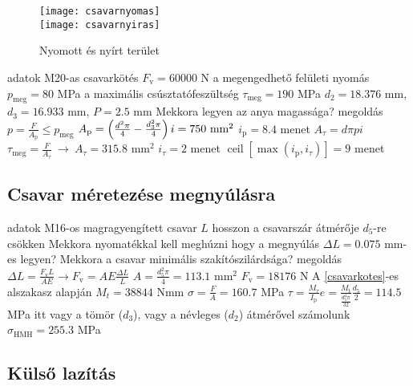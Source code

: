 \begin{wrapfigure}{r}{.4\textwidth}
 \vspace{-4cm}
 \centering
 \texttt{[image: csavarnyomas]}\\
 \texttt{[image: csavarnyiras]}
 \caption{Nyomott és nyírt terület}
\end{wrapfigure}
\parbox{.6\textwidth}{
\begin{outline}
	\1 adatok
		\2 M20-as csavarkötés
		\2 $F_\text{v} = 60000$ N
		\2 a megengedhető felületi nyomás $p_\text{meg} = 80$ MPa
		\2 a maximális csúsztatófeszültség $\tau_\text{meg} = 190$ MPa
		\2 $d_2 = 18.376$ mm, $d_3 = 16.933$ mm, $P = 2.5$ mm
		\2 Mekkora legyen az anya magassága?
	\1 megoldás
		\2 $p = \frac{F}{A_\text{p}} \le p_\text{meg}$
		\2 $A_\text{p} = \left(\frac{d^2\pi}{4} - \frac{d_3^2\pi}{4}\right)i = 750 \text{ mm}^2$
		\2 $i_\text{p} = 8.4$ menet
		\2 $A_\tau = d\pi pi$
		\2 $\tau_\text{meg} = \frac{F}{A_\tau}~\rightarrow~A_\tau=315.8\text{ mm}^2$
		\2 $i_\tau = 2$ menet
		\2 $\operatorname{ceil}[\max(i_\text{p}, i_\tau)] = 9$ menet
\end{outline}}

\subsection{Csavar méretezése megnyúlásra}%

\begin{outline}
	\1 adatok
		\2 M16-os magragyengített csavar
		\2 $L$ hosszon a csavarszár átmérője $d_5$-re csökken
		\2 Mekkora nyomatékkal kell meghúzni hogy a megnyúlás $\Delta L=0.075$ mm-es legyen?
		\2 Mekkora a csavar minimális szakítószilárdsága?
	\1 megoldás
		\2 $\Delta L = \frac{F_\text{v}L}{AE}\rightarrow F_\text{v} = AE\frac{\Delta L}{L}$
		\2 $A = \frac{d_5^2\pi}{4} = 113.1 \text{ mm}^2$
		\2 $F_\text{v} = 18176$ N
		\2 A \ref{csavarkotes}-es alszakasz alapján $M_t = 38844$ Nmm
		\2 $\sigma = \frac{F}{A} = 160.7$ MPa
		\2 $\tau = \frac{M_\tau}{I_\text{p}}e = \frac{M_\text{t}}{\frac{d_5^4\pi}{32}}\frac{d_5}{2} = 114.5$ MPa
		\2 itt vagy a tömör ($d_3$), vagy a névleges ($d_2$) átmérővel számolunk
		\2 $\sigma_\text{HMH} = 255.3$ MPa
\end{outline}

\subsection{Külső lazítás}

